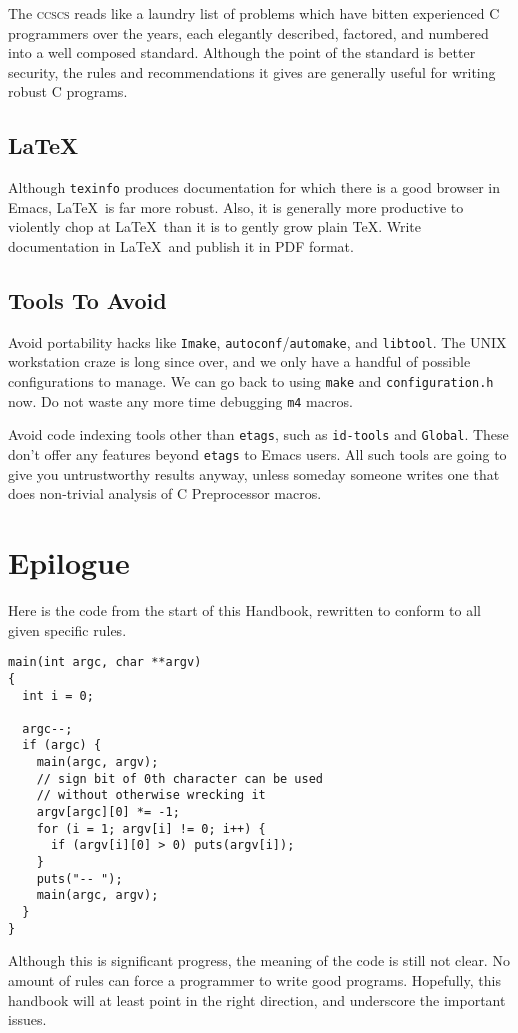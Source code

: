 \documentclass{lulu}
\newcommand{\code}[1]{\texttt{#1}\xspace}
\newcommand{\heading}[1]{\markboth{\textup{\thechapter\ -- #1}}{}}
\begin{document}
The \textsc{ccscs} reads like a laundry list of problems which have
bitten experienced C programmers over the years, each elegantly
described, factored, and numbered into a well composed standard.
Although the point of the standard is better security, the rules and
recommendations it gives are generally useful for writing robust C
programs.

\section{\LaTeX}

Although \code{texinfo} produces documentation for which there is a
good browser in Emacs, \LaTeX\ is far more robust.  Also, it is
generally more productive to violently chop at \LaTeX\ than it is to
gently grow plain \TeX.  Write documentation in \LaTeX\ and publish it
in PDF format.

\section{Tools To Avoid}

Avoid portability hacks like \code{Imake},
\code{autoconf}/\code{automake}, and \code{libtool}.  The UNIX
workstation craze is long since over, and we only have a handful of
possible configurations to manage.  We can go back to using
\code{make} and \code{configuration.h} now.  Do not waste any more
time debugging \code{m4} macros.

Avoid code indexing tools other than \code{etags}, such as
\code{id-tools} and \code{Global}.  These don't offer any features
beyond \code{etags} to Emacs users.  All such tools are going to give
you untrustworthy results anyway, unless someday someone writes one
that does non-trivial analysis of C Preprocessor macros.

\chapter*{Epilogue}
\heading{Epilogue}

Here is the code from the start of this Handbook, rewritten to conform
to all given specific rules.

\begin{samepage}
\begin{verbatim}
main(int argc, char **argv)
{
  int i = 0;
  
  argc--;
  if (argc) {
    main(argc, argv);
    // sign bit of 0th character can be used
    // without otherwise wrecking it
    argv[argc][0] *= -1;
    for (i = 1; argv[i] != 0; i++) {
      if (argv[i][0] > 0) puts(argv[i]);
    }
    puts("-- ");
    main(argc, argv);
  }
}
\end{verbatim}
\end{samepage}

Although this is significant progress, the meaning of the code is
still not clear.  No amount of rules can force a programmer to write
good programs.  Hopefully, this handbook will at least point in the
right direction, and underscore the important issues.

\newpage
\pagestyle{empty}
\mbox{}

\newpage
\pagestyle{empty}
\mbox{}
\end{document}
